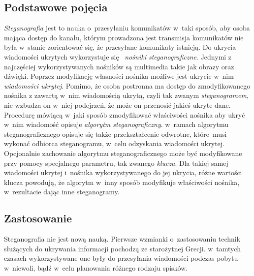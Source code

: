 \documentclass[a4paper, twoside, 12pt]{report}
\begin{document}
        \subsection{Podstawowe pojęcia} \label{STEGANOGRAFIAPOJECIA}
        \emph{Steganografia} jest to nauka o~przesyłaniu komunikatów w~taki sposób, aby
        osoba mająca dostęp do kanału, którym prowadzona jest transmisja komunikatów
        nie była w~stanie zorientować się, że przesyłane komunikaty istnieją.
        Do ukrycia wiadomości ukrytych wykorzystuje się 
        \emph{nośniki steganograficzne}\cite{STEGANOGRAFIASIECIOWAART}.
        Jednymi z najczęściej wykorzystywanych nośników są multimedia takie jak
        obrazy oraz dźwięki. Poprzez modyfikację własności nośnika możliwe jest
        ukrycie w~nim \emph{wiadomości ukrytej}. Pomimo, że osoba postronna ma
        dostęp do zmodyfikowanego nośnika z zawartą w~nim wiadomością ukrytą,
        czyli tak zwanym \emph{steganogramem}, nie wzbudza on w~niej podejrzeń,
        że może on przenosić jakieś ukryte dane. Procedurę mówiącą w~jaki sposób
        zmodyfikować właściwości nośnika aby ukryć w~nim wiadomość opisuje
        \emph{algorytm steganograficzny}. w~ramach algorytmu steganograficznego
        opisuje się także przekształcenie odwrotne, które musi
        wykonać odbiorca steganogramu, w~celu odzyskania wiadomości ukrytej.
        Opcjonalnie zachowanie algorytmu steganograficznego może być modyfikowane przy pomocy specjalnego
        parametru, tak zwanego \emph{klucza}.  Dla takiej samej wiadomości ukrytej i~nośnika
        wykorzystywanego do jej ukrycia, różne wartości klucza powodują, że algorytm
        w~inny sposób modyfikuje właściwości nośnika, w~rezultacie dając inne
        steganogramy.

        \subsection{Zastosowanie}
        Steganografia nie jest nową nauką. Pierwsze wzmianki o~zastosowaniu technik
        służących do ukrywania informacji pochodzą ze starożytnej Grecji.\cite{STEGANOGRAPHYINTRO}
        w~tamtych czasach wykorzystywane one były do przesyłania wiadomości
        podczas pobytu w~niewoli, bądź w~celu planowania różnego rodzaju spisków.
\end{document}
